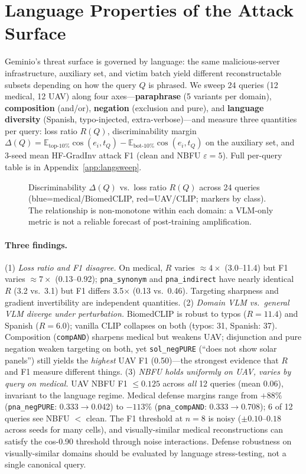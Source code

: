 \documentclass[11pt]{article}
\begin{document}
\section{Language Properties of the Attack Surface}
\label{sec:lang}

Geminio's threat surface is governed by language: the same malicious-server infrastructure, auxiliary set, and victim batch yield different reconstructable subsets depending on how the query $Q$ is phrased. We sweep 24 queries (12 medical, 12 UAV) along four axes---\textbf{paraphrase} (5 variants per domain), \textbf{composition} (and/or), \textbf{negation} (exclusion and pure), and \textbf{language diversity} (Spanish, typo-injected, extra-verbose)---and measure three quantities per query: loss ratio $R(Q)$, discriminability margin $\Delta(Q) = \mathbb{E}_{\text{top-}10\%}\cos(e_i, t_Q) - \mathbb{E}_{\text{bot-}10\%}\cos(e_i, t_Q)$ on the auxiliary set, and 3-seed mean HF-GradInv attack F1 (clean and NBFU $\varepsilon{=}5$). Full per-query table is in Appendix~\ref{app:langsweep}.

\begin{figure}[t]
\centering

\caption{Discriminability $\Delta(Q)$ vs.\ loss ratio $R(Q)$ across 24 queries (blue=medical/BiomedCLIP, red=UAV/CLIP; markers by class). The relationship is non-monotone within each domain: a VLM-only metric is not a reliable forecast of post-training amplification.}
\label{fig:langsweep}
\end{figure}

\paragraph{Three findings.} (1) \emph{Loss ratio and F1 disagree.} On medical, $R$ varies $\approx 4{\times}$ (3.0--11.4) but F1 varies $\approx 7{\times}$ (0.13--0.92); \texttt{pna\_synonym} and \texttt{pna\_indirect} have nearly identical $R$ (3.2 vs.\ 3.1) but F1 differs 3.5$\times$ (0.13 vs.\ 0.46). Targeting sharpness and gradient invertibility are independent quantities. (2) \emph{Domain VLM vs.\ general VLM diverge under perturbation.} BiomedCLIP is robust to typos ($R{=}11.4$) and Spanish ($R{=}6.0$); vanilla CLIP collapses on both (typos: 31, Spanish: 37). Composition (\texttt{compAND}) sharpens medical but weakens UAV; disjunction and pure negation weaken targeting on both, yet \texttt{sol\_negPURE} (``does not show solar panels'') still yields the \emph{highest} UAV F1 (0.50)---the strongest evidence that $R$ and F1 measure different things. (3) \emph{NBFU holds uniformly on UAV, varies by query on medical.} UAV NBFU F1 $\le 0.125$ across \emph{all} 12 queries (mean 0.06), invariant to the language regime. Medical defense margins range from $+88\%$ (\texttt{pna\_negPURE}: 0.333$\to$0.042) to $-113\%$ (\texttt{pna\_compAND}: 0.333$\to$0.708); 6 of 12 queries see NBFU $<$ clean. The F1 threshold at $n{=}8$ is noisy ($\pm 0.10$--$0.18$ across seeds for many cells), and visually-similar medical reconstructions can satisfy the cos-0.90 threshold through noise interactions. Defense robustness on visually-similar domains should be evaluated by language stress-testing, not a single canonical query.
\end{document}
